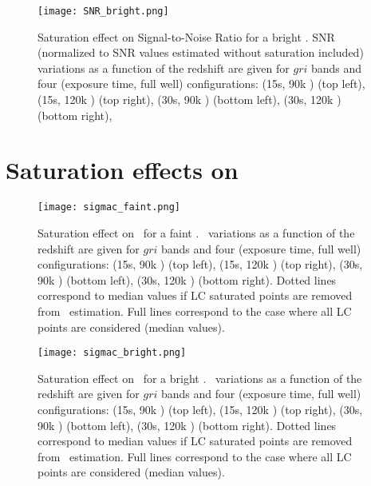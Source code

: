 \begin{appendices}
\begin{figure}[htbp]
\begin{center}
  \texttt{[image: SNR\_bright.png]}
 \caption{Saturation effect on Signal-to-Noise Ratio for a bright \sne. SNR (normalized to SNR values estimated without saturation included) variations as a function of the redshift are given for $gri$ bands and four (exposure time, full well) configurations: (15s, 90k \pe) (top left),  (15s, 120k \pe) (top right), (30s, 90k \pe) (bottom left),  (30s, 120k \pe) (bottom right),}\label{fig:snrbright}
\end{center}
\end{figure}
\newpage
\section{Saturation effects on }

\begin{figure}[htbp]
\begin{center}
  \texttt{[image: sigmac\_faint.png]}
 \caption{Saturation effect on ~for a faint \sne. ~variations as a function of the redshift are given for $gri$ bands and four (exposure time, full well) configurations: (15s, 90k \pe) (top left),  (15s, 120k \pe) (top right), (30s, 90k \pe) (bottom left),  (30s, 120k \pe) (bottom right). Dotted lines correspond to median values if LC saturated points are removed from ~estimation. Full lines correspond to the case where all LC points are considered (median values).}\label{fig:sigmafaint}
\end{center}
\end{figure}

\begin{figure}[htbp]
\begin{center}
  \texttt{[image: sigmac\_bright.png]}
 \caption{Saturation effect on ~for a bright \sne. ~variations as a function of the redshift are given for $gri$ bands and four (exposure time, full well) configurations: (15s, 90k \pe) (top left),  (15s, 120k \pe) (top right), (30s, 90k \pe) (bottom left),  (30s, 120k \pe) (bottom right). Dotted lines correspond to median values if LC saturated points are removed from ~estimation. Full lines correspond to the case where all LC points are considered (median values).}\label{fig:sigmabright}
\end{center}
\end{figure}



\end{appendices}



